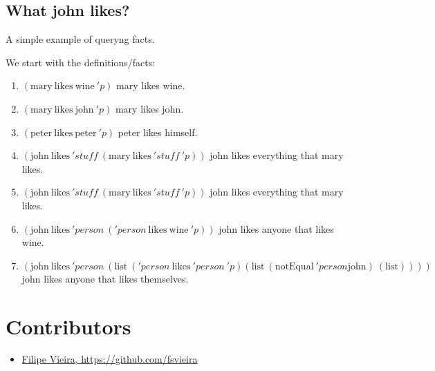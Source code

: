 \documentclass[11pt,a4paper]{report}
\newcommand{\var}[1]{'#1}
\begin{document}
\subsection{What john likes?}

A simple example of queryng facts.

We start with the definitions/facts:
\begin{enumerate}

\item $(\text{mary}\ \text{likes}\ \text{wine}\ \var{p})$
\subitem mary likes wine.

\item $(\text{mary}\ \text{likes}\ \text{john}\ \var{p})$
\subitem mary likes john.

\item $(\text{peter}\ \text{likes}\ \text{peter}\ \var{p})$
\subitem peter likes himself.

\item $(\text{john}\ \text{likes}\ \var{stuff}\ (\text{mary}\ \text{likes}\ \var{stuff}\ \var{p}))$
\subitem john likes everything that mary likes.

\item $(\text{john}\ \text{likes}\ \var{stuff}\ (\text{mary}\ \text{likes}\ \var{stuff}\ \var{p}))$
\subitem john likes everything that mary likes.

\item $(\text{john}\ \text{likes}\ \var{person}\ (\var{person}\ \text{likes}\ \text{wine}\ \var{p}))$
\subitem john likes anyone that likes wine.

\item \[
    (\text{john}\ \text{likes}\ \var{person}\ (\text{list}\ (\var{person}\ \text{likes}\ \var{person}\ \var{p}) (\text{list}\ (\text{notEqual}\ \var{person} \text{john})\ (\text{list}))))
\]
\subitem john likes anyone that likes themselves.

\end{enumerate}


\section{Contributors}
\label{sec:contributors}

\begin{itemize}
    \item \href{https://github.com/fsvieira}{Filipe Vieira, https://github.com/fsvieira}
\end{itemize}
\end{document}
